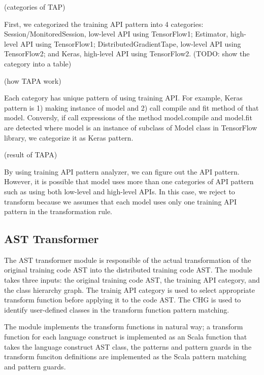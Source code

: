 (categories of TAP)

First, we categorized the training API pattern into 4 categories:
Session/MonitoredSession, low-level API using TensorFlow1;
Estimator, high-level API using TensorFlow1;
DistributedGradientTape, low-level API using TensorFlow2;
and Keras, high-level API using TensorFlow2.
(TODO: show the category into a table)

(how TAPA work)

Each category has unique pattern of using training API.
For example, Keras pattern is 1) making instance of model and
2) call compile and fit method of that model.
Conversly, if call expressions of the method model.compile and model.fit are detected
where model is an instance of subclass of Model class in TensorFlow library,
we categorize it as Keras pattern.

(result of TAPA)

By using training API pattern analyzer, we can figure out the API pattern.
However, it is possible that model uses more than one categories of API pattern
such as using both low-level and high-level APIs.
In this case, we reject to transform because we assumes
that each model uses only one training API pattern in the transformation rule.

\subsection{AST Transformer}
The AST transformer module is responsible of the actual transformation of
the original training code AST into the distributed training code AST.
The module takes three inputs: the original training code AST,
the training API category, and the class hierarchy graph.
The trainig API category is used to select appropriate transform function
before applying it to the code AST. The CHG is used to identify
user-defined classes in the transform function pattern matching.

The module implements the transform functions in natural way;
a transform function for each language construct is implemented as
an Scala function that takes the language construct AST class,
the patterns and pattern guards in the transform funciton definitions
are implemented as the Scala pattern matching and pattern guards. 

